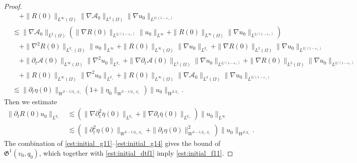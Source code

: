 \documentclass[letterpaper,reqno,10pt,twoside]{amsart}
\theoremstyle{definition}
\theoremstyle{remark}
\def\p{\partial}
\def\Om{\Omega}
\begin{document}
\begin{appendix}
\begin{proof}
\begin{equation}
\begin{aligned}
						&\quad+\|R(0)\|_{L^\infty(\Om)}\|\nabla\mathcal{A}_0\|_{L^2(\Om)}\|\nabla u_0\|_{L^{2/(1-\varepsilon_+)}}\\
						&\lesssim \|\nabla\mathcal{A}_0\|_{L^2(\Om)}(\|\nabla R(0)\|_{L^{2/(1-\varepsilon_+)}}\| u_0\|_{L^\infty}+ \|R(0)\|_{L^\infty(\Om)}\|\nabla u_0\|_{L^{2/(1-\varepsilon_+)}})\\
						&\quad+\|\nabla^2 R(0)\|_{L^{q_+}(\Om)}\| u_0\|_{L^\infty}+ \|R(0)\|_{L^\infty(\Om)}\|\nabla u_0\|_{L^{q_+}}+\|\nabla R(0)\|_{L^2(\Om)}\|\nabla u_0\|_{L^{2/(1-\varepsilon_+)}}\\
						&\quad+\|\p_t\mathcal{A}(0)\|_{L^\infty(\Om)}\|\nabla^2u_0\|_{L^{q_+}}+\|\nabla\p_t\mathcal{A}(0)\|_{L^2(\Om)}\|\nabla u_0\|_{L^{2/(1-\varepsilon_+)}}+\|\nabla R(0)\|_{L^2(\Om)}\|\nabla u_0\|_{L^{2/(1-\varepsilon_+)}}\\
						&\quad+\|R(0)\|_{L^\infty(\Om)}\|\nabla^2 u_0\|_{L^{q_+}}+\|R(0)\|_{L^\infty(\Om)}\|\nabla\mathcal{A}_0\|_{L^2(\Om)}\|\nabla u_0\|_{L^{2/(1-\varepsilon_+)}}\\
						&\lesssim\|\p_t\eta(0)\|_{W^{3-1/q_+,q_+}}(1+\|\eta_0\|_{W^{3-1/q_+,q_+}})\|u_0\|_{W^{2,q_+}}.
					\end{aligned}
				\end{equation}
				Then we estimate
				\begin{equation}\label{est:initial_g14}
					\begin{aligned}
						\|\p_tR(0)u_0\|_{L^{q_+}}&\lesssim(\|\nabla\p_t^2\bar{\eta}(0)\|_{L^{q_+}}+\|\nabla\p_t\bar{\eta}(0)\|_{L^{q_+}})\| u_0\|_{L^\infty}\\
						&\lesssim (\|\p_t^2\eta(0)\|_{W^{2-1/q_+,q_+}}+\|\p_t\eta(0)\|_{W^{3-1/q_+,q_+}}^2)\|u_0\|_{W^{2,q_+}}.
					\end{aligned}
				\end{equation}
				The combination of \eqref{est:initial_g11}--\eqref{est:initial_g14} gives the bound of  $\mathfrak{G}^1(v_0, q_0)$, which together with \eqref{est:initial_dtf1} imply \eqref{est:initial_f11}.
				

\end{proof}
\end{appendix}
\end{document}
